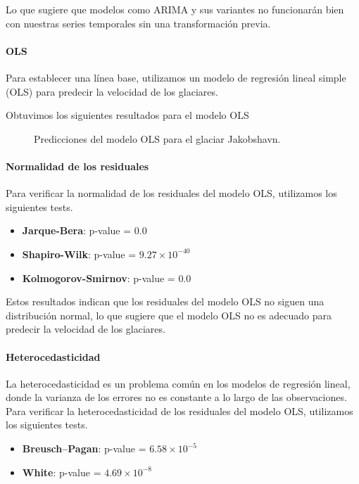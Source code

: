 \documentclass[sigconf,language=spanish]{acmart}
\begin{document}
Lo que sugiere que modelos como ARIMA y sus variantes no funcionarán bien con nuestras series temporales sin una transformación previa.

\paragraph{OLS}

Para establecer una línea base, utilizamos un modelo de regresión lineal simple (OLS) para predecir la velocidad de los glaciares.

Obtuvimos los siguientes resultados para el modelo OLS

\begin{figure}[htbp]
   \centering
   
    \caption{Predicciones del modelo OLS para el glaciar Jakobshavn.}
    \label{fig:jakobshavn_ols}
\end{figure}

\paragraph{Normalidad de los residuales}

Para verificar la normalidad de los residuales del modelo OLS, utilizamos los siguientes tests.
\begin{itemize}
  \item \textbf{Jarque-Bera}: p-value = $0.0$
  \item \textbf{Shapiro-Wilk}: p-value = $9.27 \times 10^{-40}$
  \item \textbf{Kolmogorov-Smirnov}: p-value = $0.0$
\end{itemize}

Estos resultados indican que los residuales del modelo OLS no siguen una distribución normal, lo que sugiere que el modelo OLS no es adecuado para predecir la velocidad de los glaciares.

\paragraph{Heterocedasticidad}

La heterocedasticidad es un problema común en los modelos de regresión lineal, donde la varianza de los errores no es constante a lo largo de las observaciones.
Para verificar la heterocedasticidad de los residuales del modelo OLS, utilizamos los siguientes tests.

\begin{itemize}
  \item \textbf{Breusch–Pagan}: p-value = $6.58 \times 10^{-5}$
  \item \textbf{White}: p-value = $4.69 \times 10^{-8}$
\end{itemize}
\end{document}
